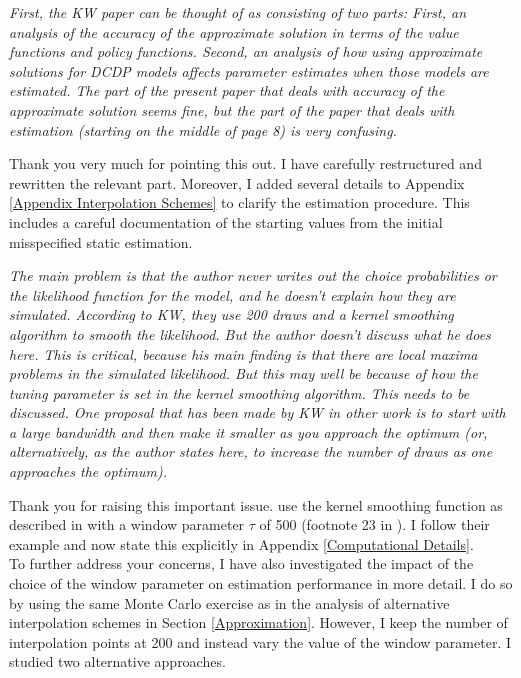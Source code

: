 \begin{boenumerate}
\item \textit{First, the KW paper can be thought of as consisting of two parts: First, an analysis of the accuracy of the approximate solution in terms of the value functions and policy functions. Second, an analysis of how using approximate solutions for DCDP models affects parameter estimates when those models are estimated. The part of the present paper that deals with accuracy of the approximate solution seems fine, but the part of the paper that deals with estimation (starting on the middle of page 8) is very confusing.}\vspace{0.5cm}

Thank you very much for pointing this out. I have carefully restructured and rewritten the relevant part. Moreover, I added several details to Appendix \ref{Appendix Interpolation Schemes} to clarify the estimation procedure. This includes a careful documentation of the starting values from the initial misspecified static estimation.
\item \textit{The main problem is that the author never writes out the choice probabilities or the likelihood function for the model, and he doesn't explain how they are simulated. According to KW, they use 200 draws and a kernel smoothing algorithm to smooth the likelihood. But the author doesn't discuss what he does here. This is critical, because his main finding is that there are local maxima problems in the simulated likelihood. But this may well be because of how the tuning parameter is set in the kernel smoothing algorithm. This needs to be discussed. One proposal that has been made by KW in other work is to start with a large bandwidth and then make it smaller as you approach the optimum (or, alternatively, as the author states here, to increase the number of draws as one approaches the optimum).}\vspace{0.5cm}

Thank you for raising this important issue. \cite{Keane.1994} use the kernel smoothing function as described in \citet{McFadden.1989} with a window parameter $\tau$ of 500 (footnote 23 in \cite{Keane.1994}). I follow their example and now state this explicitly in Appendix \ref{Computational Details}.\\\newline
%
To further address your concerns, I have also investigated the impact of the choice of the window parameter on estimation performance in more detail. I do so by using the same Monte Carlo exercise as in the analysis of alternative interpolation schemes in Section \ref{Approximation}. However, I keep the number of interpolation points at 200 and instead vary the value of the window parameter. I studied two alternative approaches.


\end{boenumerate}
